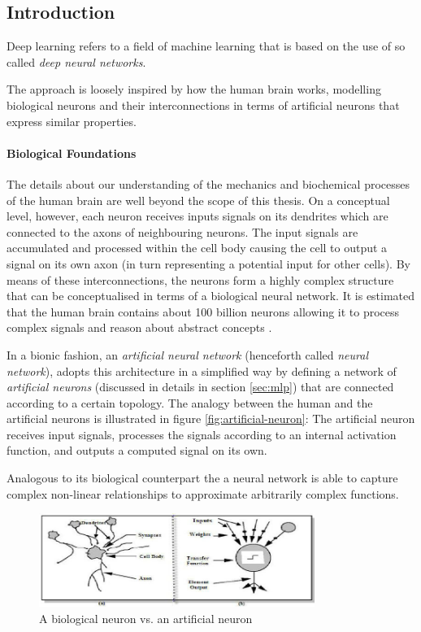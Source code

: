 \subsection{Introduction}
Deep learning refers to a field of machine learning that is based on the use of so called \emph{deep neural networks}. 

The approach is loosely inspired by how the human brain works,  modelling biological neurons and their interconnections in terms of artificial neurons that express similar properties.


\paragraph{Biological Foundations}
The details about our understanding of the mechanics and biochemical processes of the human brain are well beyond the scope of this thesis. On a conceptual level, however, each neuron receives inputs signals on its dendrites which are connected to the axons of neighbouring neurons. The input signals are accumulated and processed within the cell body causing the cell to output a signal on its own axon (in turn representing a potential input for other cells). By means of these interconnections, the neurons form a highly complex structure that can be conceptualised in terms of a biological neural network. It is estimated that the human brain contains about 100 billion neurons  allowing it to process complex signals and reason about abstract concepts \cite{number-of-neurons}. 

In a bionic fashion, an \emph{artificial neural network} (henceforth called \emph{neural network}), adopts this architecture in a simplified way by defining a network of \emph{artificial neurons} (discussed in details in section \ref{sec:mlp}) that are connected according to a certain topology. The analogy between the human and the artificial neurons is illustrated in figure \ref{fig:artificial-neuron}: The artificial neuron receives input signals, processes the signals according to an internal activation function, and outputs a computed signal on its own. 

Analogous to its biological counterpart the a neural network is able to capture complex non-linear relationships to approximate arbitrarily complex functions. 



\begin{figure}[h]
	\caption{A biological neuron vs. an artificial neuron}\label{fig:biological-vs-artificial-neuron}
	\centering
	\includegraphics[width=0.8\textwidth]{figures/chapter-2/biological-vs-artificial-neurons.png}
\end{figure}



